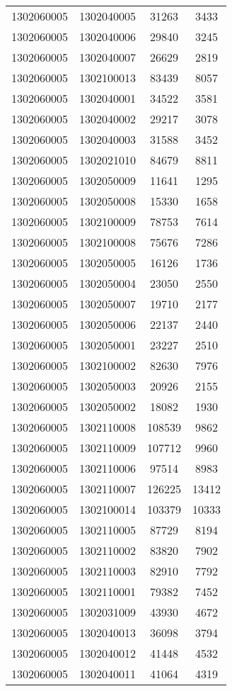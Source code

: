 \begin{longtable}{llcc}
1302060005 & 1302040005 & 31263 & 3433\\
1302060005 & 1302040006 & 29840 & 3245\\
1302060005 & 1302040007 & 26629 & 2819\\
1302060005 & 1302100013 & 83439 & 8057\\
1302060005 & 1302040001 & 34522 & 3581\\
1302060005 & 1302040002 & 29217 & 3078\\
1302060005 & 1302040003 & 31588 & 3452\\
1302060005 & 1302021010 & 84679 & 8811\\
1302060005 & 1302050009 & 11641 & 1295\\
1302060005 & 1302050008 & 15330 & 1658\\
1302060005 & 1302100009 & 78753 & 7614\\
1302060005 & 1302100008 & 75676 & 7286\\
1302060005 & 1302050005 & 16126 & 1736\\
1302060005 & 1302050004 & 23050 & 2550\\
1302060005 & 1302050007 & 19710 & 2177\\
1302060005 & 1302050006 & 22137 & 2440\\
1302060005 & 1302050001 & 23227 & 2510\\
1302060005 & 1302100002 & 82630 & 7976\\
1302060005 & 1302050003 & 20926 & 2155\\
1302060005 & 1302050002 & 18082 & 1930\\
1302060005 & 1302110008 & 108539 & 9862\\
1302060005 & 1302110009 & 107712 & 9960\\
1302060005 & 1302110006 & 97514 & 8983\\
1302060005 & 1302110007 & 126225 & 13412\\
1302060005 & 1302100014 & 103379 & 10333\\
1302060005 & 1302110005 & 87729 & 8194\\
1302060005 & 1302110002 & 83820 & 7902\\
1302060005 & 1302110003 & 82910 & 7792\\
1302060005 & 1302110001 & 79382 & 7452\\
1302060005 & 1302031009 & 43930 & 4672\\
1302060005 & 1302040013 & 36098 & 3794\\
1302060005 & 1302040012 & 41448 & 4532\\
1302060005 & 1302040011 & 41064 & 4319\\

\end{longtable}

